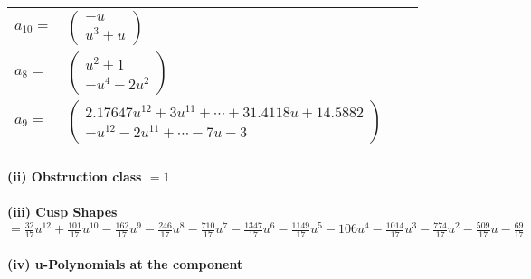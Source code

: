 \documentclass[1p]{elsarticle_modified}
\theoremstyle{definition}
\begin{document}
\begin{tabular}{m{7pt} m{180pt} m{7pt} m{180pt} }
\flushright $a_{10}=$&$\begin{pmatrix}- u\\u^3+u\end{pmatrix}$ \\
\flushright $a_{8}=$&$\begin{pmatrix}u^2+1\\- u^4-2 u^2\end{pmatrix}$ \\
\flushright $a_{9}=$&$\begin{pmatrix}2.17647 u^{12}+3 u^{11}+\cdots+31.4118 u+14.5882\\- u^{12}-2 u^{11}+\cdots-7 u-3\end{pmatrix}$\\&\end{tabular}
\flushleft \textbf{(ii) Obstruction class $= 1$}\\~\\
\flushleft \textbf{(iii) Cusp Shapes $= \frac{32}{17} u^{12}+\frac{101}{17} u^{10}-\frac{162}{17} u^9-\frac{246}{17} u^8-\frac{710}{17} u^7-\frac{1347}{17} u^6-\frac{1149}{17} u^5-106 u^4-\frac{1014}{17} u^3-\frac{774}{17} u^2-\frac{509}{17} u-\frac{69}{17}$}\\~\\
\newpage\renewcommand{\arraystretch}{1}
\flushleft \textbf{(iv) u-Polynomials at the component}\newline \\
\end{document}
